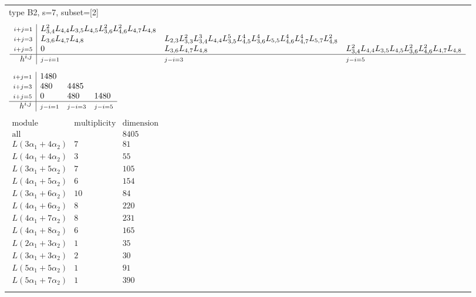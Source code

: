 \documentclass[crop,border=2mm]{standalone}
\begin{document}
\begin{tabular}{l}
{\huge type B2, s=7, subset=[2]}\\ \\


$\displaystyle
\begin{array}{r|l l l}
	{\scriptstyle i+j=1}&L_{3,4}^{2}L_{4,4}L_{3,5}L_{4,5}L_{3,6}^{2}L_{4,6}^{2}L_{4,7}L_{4,8}&&\\
	{\scriptstyle i+j=3}&L_{3,6}L_{4,7}L_{4,8}&L_{2,3}L_{3,3}^{2}L_{3,4}^{3}L_{4,4}L_{3,5}^{5}L_{4,5}^{4}L_{3,6}^{4}L_{5,5}L_{4,6}^{4}L_{4,7}^{4}L_{5,7}L_{4,8}^{2}&\\
	{\scriptstyle i+j=5}&0&L_{3,6}L_{4,7}L_{4,8}&L_{3,4}^{2}L_{4,4}L_{3,5}L_{4,5}L_{3,6}^{2}L_{4,6}^{2}L_{4,7}L_{4,8}\\
	\hline h^{i,j}&{\scriptstyle j-i=1}&{\scriptstyle j-i=3}&{\scriptstyle j-i=5}
\end{array}
$ \\ \\


$\displaystyle
\begin{array}{r|l l l}
	{\scriptstyle i+j=1}&1480&&\\
	{\scriptstyle i+j=3}&480&4485&\\
	{\scriptstyle i+j=5}&0&480&1480\\
	\hline h^{i,j}&{\scriptstyle j-i=1}&{\scriptstyle j-i=3}&{\scriptstyle j-i=5}
\end{array}
$ \\ \\


$\displaystyle
\begin{array}{rll}
	\text{module}&\text{multiplicity}&\text{dimension} \\ \hline \text{all}&&8405 \\
	L\left( 3\alpha_{1}+ 4\alpha_{2}\right)&7&81\\
	L\left( 4\alpha_{1}+ 4\alpha_{2}\right)&3&55\\
	L\left( 3\alpha_{1}+ 5\alpha_{2}\right)&7&105\\
	L\left( 4\alpha_{1}+ 5\alpha_{2}\right)&6&154\\
	L\left( 3\alpha_{1}+ 6\alpha_{2}\right)&10&84\\
	L\left( 4\alpha_{1}+ 6\alpha_{2}\right)&8&220\\
	L\left( 4\alpha_{1}+ 7\alpha_{2}\right)&8&231\\
	L\left( 4\alpha_{1}+ 8\alpha_{2}\right)&6&165\\
	L\left( 2\alpha_{1}+ 3\alpha_{2}\right)&1&35\\
	L\left( 3\alpha_{1}+ 3\alpha_{2}\right)&2&30\\
	L\left( 5\alpha_{1}+ 5\alpha_{2}\right)&1&91\\
	L\left( 5\alpha_{1}+ 7\alpha_{2}\right)&1&390
\end{array}
$ \\ \\

\end{tabular}
\end{document}
